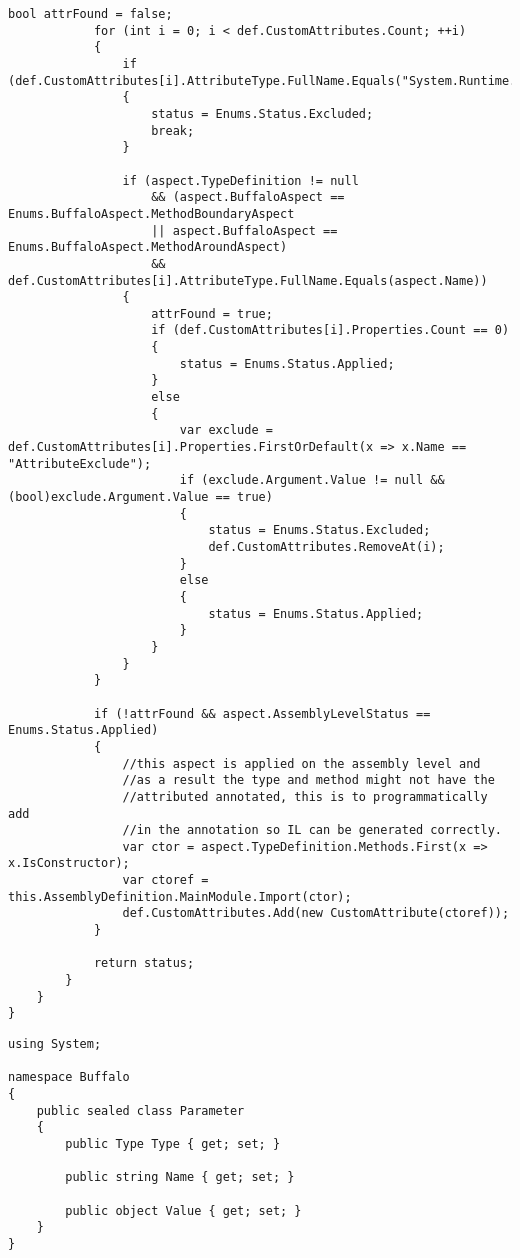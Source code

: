 \begin{lstlisting}[caption={../buffalo/Weaver.cs}, label=../buffalo/Weaver.cs, frame=tb, basicstyle=\scriptsize]
            bool attrFound = false;
            for (int i = 0; i < def.CustomAttributes.Count; ++i)
            {
                if (def.CustomAttributes[i].AttributeType.FullName.Equals("System.Runtime.CompilerServices.CompilerGeneratedAttribute"))
                {
                    status = Enums.Status.Excluded;
                    break;
                }

                if (aspect.TypeDefinition != null
                    && (aspect.BuffaloAspect == Enums.BuffaloAspect.MethodBoundaryAspect
                    || aspect.BuffaloAspect == Enums.BuffaloAspect.MethodAroundAspect)
                    && def.CustomAttributes[i].AttributeType.FullName.Equals(aspect.Name))
                {
                    attrFound = true;
                    if (def.CustomAttributes[i].Properties.Count == 0)
                    {
                        status = Enums.Status.Applied;
                    }
                    else
                    {
                        var exclude = def.CustomAttributes[i].Properties.FirstOrDefault(x => x.Name == "AttributeExclude");
                        if (exclude.Argument.Value != null && (bool)exclude.Argument.Value == true)
                        {
                            status = Enums.Status.Excluded;
                            def.CustomAttributes.RemoveAt(i);
                        }
                        else
                        {
                            status = Enums.Status.Applied;
                        }
                    }
                }
            }

            if (!attrFound && aspect.AssemblyLevelStatus == Enums.Status.Applied)
            {
                //this aspect is applied on the assembly level and
                //as a result the type and method might not have the
                //attributed annotated, this is to programmatically add
                //in the annotation so IL can be generated correctly.
                var ctor = aspect.TypeDefinition.Methods.First(x => x.IsConstructor);
                var ctoref = this.AssemblyDefinition.MainModule.Import(ctor);
                def.CustomAttributes.Add(new CustomAttribute(ctoref));
            }

            return status;
        }
    }
}\end{lstlisting}

\begin{lstlisting}[caption={../buffalo/Parameter.cs}, label=../buffalo/Parameter.cs, frame=tb, basicstyle=\scriptsize]﻿using System;

namespace Buffalo
{
    public sealed class Parameter
    {
        public Type Type { get; set; }

        public string Name { get; set; }

        public object Value { get; set; }
    }
}
\end{lstlisting}

